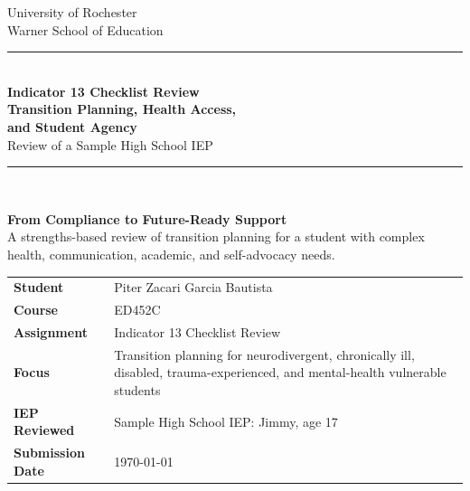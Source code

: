 \begin{titlepage}
\thispagestyle{empty}

\begin{center}
{\large University of Rochester\\}
{\normalsize Warner School of Education\\[0.35in]}

{\color{PrimaryRed}\rule{\textwidth}{1.4pt}}\\[0.22in]

{\Huge\bfseries Indicator 13 Checklist Review\\[0.08in]
Transition Planning, Health Access,\\[0.08in]
and Student Agency}\\[0.18in]

{\Large Review of a Sample High School IEP}\\[0.22in]

{\color{PrimaryRed}\rule{0.78\textwidth}{0.7pt}}\\[0.32in]

\colorbox{SoftBlue}{%
\parbox{0.88\textwidth}{%
\centering\vspace{0.12in}
\textbf{From Compliance to Future-Ready Support}\\[0.05in]
A strengths-based review of transition planning for a student with complex health, communication, academic, and self-advocacy needs.
\vspace{0.12in}
}%
}
\end{center}

\vspace{0.38in}

\begin{center}
\renewcommand{\arraystretch}{1.18}
\setlength{\tabcolsep}{4pt}
\begin{tabular}{>{\bfseries\RaggedLeft}p{1.65in} p{4.9in}}
Student & Piter Zacari Garcia Bautista \\
Course & ED452C \\
Assignment & Indicator 13 Checklist Review \\
Focus & Transition planning for neurodivergent, chronically ill, disabled, trauma-experienced, and mental-health vulnerable students \\
IEP Reviewed & Sample High School IEP: Jimmy, age 17 \\
Submission Date & \today \\
\end{tabular}
\end{center}


\end{titlepage}
